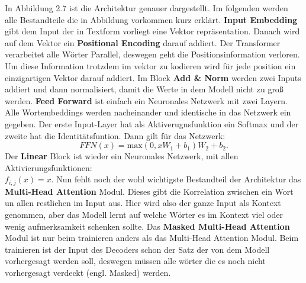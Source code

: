 \documentclass[12pt,letterpaper,ngerman]{article}
\begin{document}
In Abbildung 2.7 ist die Architektur genauer dargestellt. Im folgenden
werden alle Bestandteile die in Abbildung vorkommen kurz erklärt. 
{\bf Input Embedding} gibt dem Input der in Textform vorliegt eine 
Vektor repräsentation. Danach wird auf dem Vektor ein
{\bf Positional Encoding} darauf addiert. Der Transformer verarbeitet
alle Wörter Parallel, deswegen geht die Positionsinformation verloren.
Um diese Information trotzdem im vektor zu kodieren wird für jede
position ein einzigartigen Vektor darauf addiert. Im Block {\bf Add \& Norm}
werden zwei Inputs addiert und dann normalisiert, damit die Werte in dem
Modell nicht zu groß werden. {\bf Feed Forward} ist einfach ein Neuronales 
Netzwerk mit zwei Layern. Alle Wortembeddings werden nacheinander und 
identische in das Netzwerk ein gegeben. Der erste Input-Layer hat
als Aktiverugnsfunktion ein Softmax und der zweite hat die Identitätsfuntion.
Dann gilt für das Netzwerk:
\[
  FFN(x) =\text{max}(0, xW_1 + b_1)W_2 + b_2.
\]
Der {\bf Linear } Block ist wieder ein Neuronales Netzwerk, mit allen
Aktivierungsfunktionen: \\$ f_{i,j}(x) = x $. Nun fehlt noch der wohl 
wichtigste Bestandteil der Architektur das {\bf Multi-Head Attention}
Modul. Dieses gibt die Korrelation zwischen ein Wort un allen restlichen
im Input aus. Hier wird also der ganze Input als Kontext genommen, aber
das Modell lernt auf welche Wörter es im Kontext viel oder wenig
aufmerksamkeit schenken sollte. Das {\bf Masked Multi-Head Attention}
Modul ist nur beim trainieren anders als das Multi-Head Attention Modul.
Beim trainieren ist der Input des Decoders schon der Satz der von dem Modell
vorhergesagt werden soll, deswegen müssen alle wörter die es noch nicht 
vorhergesagt verdeckt (engl. Masked) werden.
\end{document}
